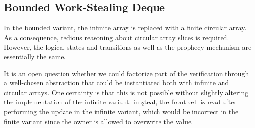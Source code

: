 \subsection{Bounded Work-Stealing Deque}

In the bounded variant, the infinite array is replaced with a finite circular array.
As a consequence, tedious reasoning about circular array slices is required.
However, the logical states and transitions as well as the prophecy mechanism are essentially the same.

It is an open question whether we could factorize part of the verification through a well-chosen abstraction that could be instantiated both with infinite and circular arrays.
One certainty is that this is not possible without slightly altering the implementation of the infinite variant: in \c{steal}, the front cell is read after performing the update in the infinite variant, which would be incorrect in the finite variant since the owner is allowed to overwrite the value.
